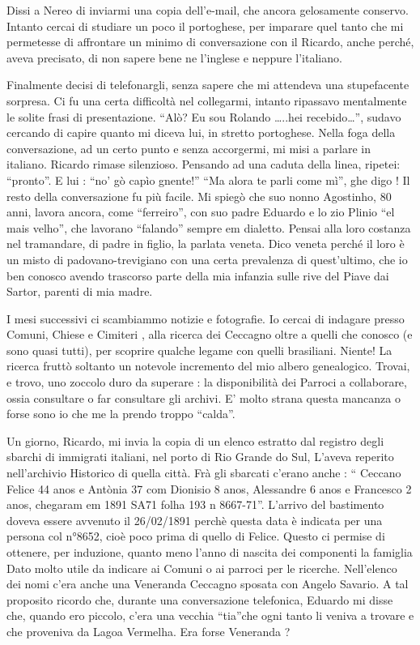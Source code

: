 \documentclass[a4paper,10pt]{book}
\begin{document}
Dissi a Nereo di inviarmi una copia dell’e-mail, che ancora gelosamente conservo. Intanto cercai di studiare un poco il portoghese, per imparare quel tanto che mi permetesse di affrontare un minimo di conversazione con il Ricardo, anche perché, aveva precisato, di non sapere bene ne l’inglese e neppure l’italiano.

Finalmente decisi di telefonargli, senza sapere che mi attendeva una stupefacente sorpresa. 
Ci fu una certa difficoltà nel collegarmi, intanto ripassavo mentalmente le solite frasi di presentazione. “Alò? Eu sou Rolando …..hei recebido…”, sudavo cercando di capire quanto mi diceva lui, in stretto portoghese. Nella foga della conversazione, ad un certo punto e senza accorgermi, mi misi a parlare in italiano. Ricardo rimase silenzioso. Pensando ad una caduta della linea, ripetei: “pronto”. E lui : “no’ gò capìo gnente!” “Ma alora te parli come mì”, ghe digo ! Il resto della conversazione fu più facile.\newline
Mi spiegò che suo nonno Agostinho, 80 anni, lavora ancora, come “ferreiro”, con suo padre Eduardo e lo zio Plinio “el mais velho”, che lavorano “falando” sempre em dialetto. Pensai alla loro costanza nel tramandare, di padre in figlio, la parlata veneta. Dico veneta perché il loro è un misto di padovano-trevigiano con una certa prevalenza di quest’ultimo, che io ben conosco avendo trascorso parte della mia infanzia sulle rive del Piave dai Sartor, parenti di mia madre.

I mesi successivi ci scambiammo notizie e fotografie. Io cercai di indagare presso Comuni, Chiese e Cimiteri , alla ricerca dei Ceccagno oltre a quelli che conosco (e sono quasi tutti), per scoprire qualche legame con quelli brasiliani. Niente! La ricerca fruttò soltanto un notevole incremento del mio albero genealogico. Trovai, e trovo, uno zoccolo duro da superare : la disponibilità dei Parroci a  collaborare, ossia consultare o far consultare gli archivi. E’ molto strana questa mancanza o forse sono io che me la prendo troppo “calda”.

Un giorno, Ricardo, mi invia la copia di un elenco estratto dal registro degli sbarchi di immigrati italiani, nel porto di Rio Grande do Sul, L’aveva reperito nell’archivio Historico di quella città. Frà gli sbarcati c’erano anche : “ Ceccano Felice 44 anos e Antònia 37 com Dionisio 8 anos, Alessandre 6 anos e Francesco 2 anos, chegaram em 1891 SA71 folha 193 n 8667-71”. L’arrivo del bastimento doveva essere avvenuto il 26/02/1891 perchè questa data è indicata per una persona col n°8652, cioè poco prima di quello di Felice. Questo ci permise di ottenere, per induzione, quanto meno l’anno di nascita dei componenti la famiglia Dato molto utile da indicare ai Comuni o ai parroci per le ricerche. Nell’elenco dei nomi c’era anche una Veneranda Ceccagno sposata con Angelo Savario. A tal proposito ricordo che, durante una conversazione telefonica, Eduardo mi disse che, quando ero piccolo,  c’era una vecchia “tia”che ogni tanto li veniva a trovare e che proveniva da Lagoa Vermelha. Era forse Veneranda ? 
\end{document}
